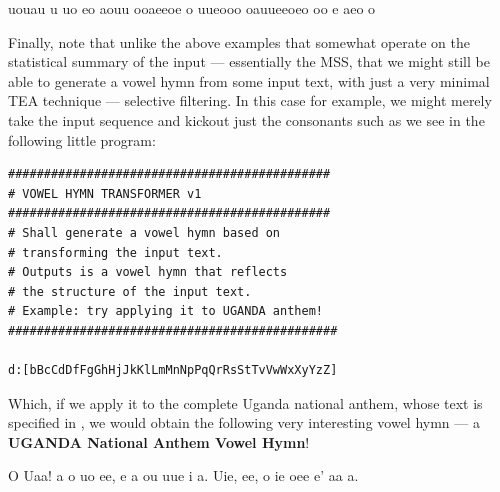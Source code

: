 \documentclass[a4paper, 18pt]{book} %
\begin{document}
{{{\vspace{2em}


\vspace{2em}
  
   \begin{tcbverbatim}[title=Sample Vowel Hymn OUTPUT 4]
uouau u uo
eo aouu
 ooaeeoe 
 o uueooo
 oauueeoeo
oo e aeo o
  \end{tcbverbatim}
 

\vspace{2em}

Finally, note that unlike the above examples that somewhat operate on the statistical summary of the input --- essentially the MSS, that we might still be able to generate a vowel hymn from some input text, with just a very minimal TEA technique --- selective filtering. In this case for example, we might merely take the input sequence and kickout just the consonants such as we see in the following little program:



  \begin{tcolorbox}[teaterminalstyle, title=TEA Application: VOWEL HYMN TRANSFORMER v1, breakable]
  \begin{lstlisting}[language=TEA,breaklines=true,]
#############################################
# VOWEL HYMN TRANSFORMER v1
#############################################
# Shall generate a vowel hymn based on 
# transforming the input text.
# Outputs is a vowel hymn that reflects
# the structure of the input text.
# Example: try applying it to UGANDA anthem!
##############################################

d:[bBcCdDfFgGhHjJkKlLmMnNpPqQrRsStTvVwWxXyYzZ]
   \end{lstlisting}
  \end{tcolorbox}
  \label{FIGTEAVOWELHYMNTRANS}

\vspace{1em}


Which, if we apply it to the complete Uganda national anthem, whose text is specified in \cite{lutalo2025rock}, we would obtain the following very interesting vowel hymn --- a \textbf{UGANDA National Anthem Vowel Hymn}!



\vspace{2em}
  
   \begin{tcbverbatim}[title=UGANDA National Vowel Anthem]
O Uaa! a o uo ee,
e a ou uue i  a.
Uie, ee,
o ie
oee e' aa a.


\end{tcbverbatim}}}}
\end{document}
